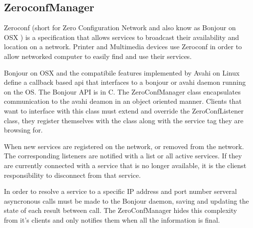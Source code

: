 \subsection{ZeroconfManager}

Zeroconf (short for Zero Configuration Network and also know as Bonjour on OSX ) is a specification that allows services to broadcast their availability and location on a network. Printer and Multimedia devices use Zeroconf in order to allow networked computer to easily find and use their services.

Bonjour on OSX and the compatibile features implemented by Avahi on Linux define a callback based api that interfaces to a bonjour or avahi daemon running on the OS. The Bonjour API is in C. The ZeroConfManager class encapsulates communication to the avahi deamon in an object oriented manner. Clients that want to interface with this class must extend and override the ZeroConfListener class, they register themselves with the class along with the service tag they are browsing for.

When new services are registered on the network, or removed from the network. The corresponding listeners are notified with a list or all active services. If they are currently connected with a service that is no longer available, it is the clienst responsibility to disconnect from that service.

In order to resolve a service to a specific IP address and port number serveral asyncronous calls must be made to the Bonjour daemon, saving and updating the state of each result between call. The ZeroConfManager hides this complexity from it's clients and only notifies them when all the information is final.




